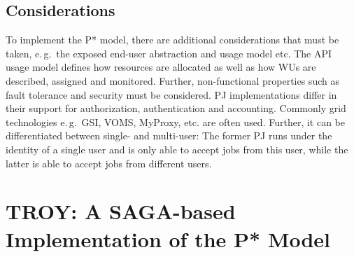 \documentclass[conference,final]{IEEEtran}
\newcommand{\jhanote}[1]{ {\textcolor{red} { ***shantenu: #1 }}}
\newcommand{\msnote}[1]{ {\textcolor{cyan} { ***mark: #1 }}}
\newcommand{\jhanote}[1]{}
\newcommand{\msnote}[1]{}
\newcommand{\upp}{\vspace*{-0.5em}}
\begin{document}
\subsection{Considerations\upp\upp}




To implement the P* model, there are additional considerations that must be
taken, e.\,g.\ the exposed end-user abstraction and usage model etc. The API
usage model defines how resources are allocated as well as how WUs are
described, assigned and monitored. Further, non-functional properties such as
fault tolerance and security must be considered. PJ implementations differ in
their support for authorization, authentication and accounting. Commonly grid
technologies e.\,g.\ GSI, VOMS, MyProxy, etc. are often used. Further, it can be
differentiated between single- and multi-user: The former PJ runs under the
identity of a single user and is only able to accept jobs from this user, while
the latter is able to accept jobs from different users.



\section{TROY: A SAGA-based Implementation of the P* Model\upp\upp}


\end{document}
